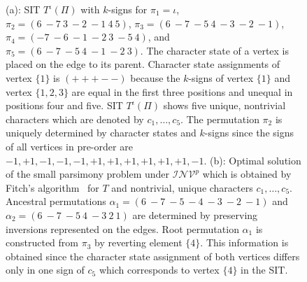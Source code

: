 \documentclass{svmult}
\newcommand{\m}[1]{\mathcal{#1}}
\begin{document}
\begin{figure}
	\begin{center}
		\quad
	\end{center}
	\caption{(a): SIT ${T}^\iota(\Pi)$ with $k$-signs for $\pi_1=\iota$,
	$\pi_2=(6~-{7}~3~-{2}~-{1}~4~5)$,
	$\pi_3=(6~-{7}~-{5}~4~-{3}~-{2}~-{1})$,
	$\pi_4=(-{7}~-{6}~-{1}~-{2}~3~-{5}~4)$, and
	$\pi_5=(6~-{7}~-{5}~4~-{1}~-{2}~3)$.
	The character state of a vertex is placed on the edge to its parent.
	Character state assignments of vertex $\{1\}$	is $(+++--)$ because the $k$-signs of vertex $\{1\}$ and vertex
	$\{1,2,3\}$ are equal in the first three positions and unequal in positions
	four and five.
	SIT ${T}^\iota(\Pi)$ shows five unique, nontrivial characters which are
	denoted by $c_1,\ldots,c_5$.
	The permutation $\pi_2$ is uniquely determined by character states and
	$k$-signs since the signs of all vertices in pre-order are
	$-1,+1,-1,-1,-1,+1,+1,+1,+1,+1,+1,-1$.
	(b): Optimal solution of the small parsimony problem under $\m{INV}^p$
	which is obtained by Fitch's algorithm~\cite{Fitch_1971} for $T$
	and nontrivial, unique characters $c_1,\ldots,c_5$.
	Ancestral permutations
	$\alpha_1=(6~-{7}~-{5}~-{4}~-{3}~-{2}~-{1})$ and
	$\alpha_2=(6~-{7}~-{5}~4~-{3}~2~1)$ are determined by preserving inversions represented on the edges.
	Root permutation $\alpha_1$ is constructed from $\pi_3$ by reverting element
	$\{4\}$.
	This information is obtained since the character state assignment of both
	vertices differs only in one sign of $c_5$ which corresponds to vertex $\{4\}$ in the SIT.}
	\label{fig:SIT_parsimony}
\end{figure}
\end{document}
